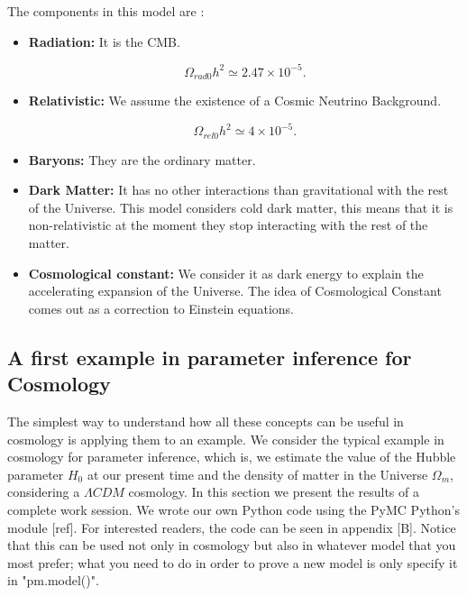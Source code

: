\documentclass[onecolumn,           %
               showpacs,            %
               preprintnumbers,     %
               aps,                 %
               letterpaper,             %
               superscriptaddress,      %
               nofootinbib,         %
               tightenlines,        %
               floats,floatfix      %
               ,usenatbib,
               ]{revtex4-1}
\begin{document}
The components in this model are \cite{liddle}:

\begin{itemize}
	\item \textbf{Radiation:} It is the CMB.
	
	\begin{equation}
	\Omega_{rad 0}h^2 \simeq 2.47 \times 10^{-5} .
	\end{equation}
	
	\item \textbf{Relativistic:} We assume the existence of a Cosmic Neutrino Background.
	
	\begin{equation}
	\Omega_{rel 0}h^2 \simeq 4 \times 10^{-5} .
	\end{equation}
	
	\item \textbf{Baryons:} They are the ordinary matter. 
	
	\item \textbf{Dark Matter:} It has no other interactions than gravitational with the rest of the Universe. This model considers cold dark matter, this means that it is non-relativistic at the moment they stop interacting with the rest of the matter.
	
	\item \textbf{Cosmological constant:} We consider it as dark energy to explain the accelerating expansion of the Universe. The idea of Cosmological Constant comes out as a correction to Einstein equations.
\end{itemize}



\subsection{A first example in parameter inference for Cosmology}

The simplest way to understand how all these concepts can be useful in cosmology is applying them to an example. We consider the typical example in cosmology for parameter inference, which is, we estimate the value of the Hubble parameter $H_0$ at our present time and the density of matter in the Universe $\Omega_m$, considering a $\Lambda CDM$ cosmology. In this section we present the results of a complete work session. We wrote our own Python code using the PyMC Python's module [ref]. For interested readers, the code can be seen in appendix [B]. Notice that this can be used not only in cosmology but also in whatever model that you most prefer; what you need to do in order to prove a new model is only specify it in "pm.model()". 
\end{document}
